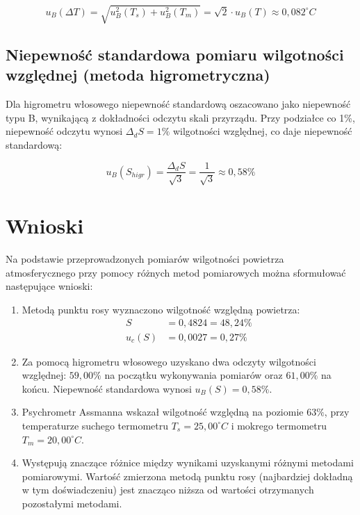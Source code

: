 \documentclass[a4paper,12pt]{article}
\begin{document}
\begin{equation}
    u_B(\Delta T) = \sqrt{u_B^2(T_s) + u_B^2(T_m)} = \sqrt{2} \cdot u_B(T) \approx 0{,}082^\circ C
\end{equation}


\subsection{Niepewność standardowa pomiaru wilgotności względnej (metoda higrometryczna)}

Dla higrometru włosowego niepewność standardową oszacowano jako niepewność typu B, wynikającą z dokładności odczytu skali przyrządu. Przy podziałce co 1\%, niepewność odczytu wynosi $\Delta_d S = 1\%$ wilgotności względnej, co daje niepewność standardową:

\begin{equation}
    u_B(S_{higr}) = \frac{\Delta_d S}{\sqrt{3}} = \frac{1}{\sqrt{3}} \approx 0{,}58\%
\end{equation}

\section{Wnioski}

Na podstawie przeprowadzonych pomiarów wilgotności powietrza atmosferycznego przy pomocy różnych metod pomiarowych można sformułować następujące wnioski:

\begin{enumerate}
    \item Metodą punktu rosy wyznaczono wilgotność względną powietrza:
          \begin{align*}
              S      & = 0{,}4824 = 48{,}24\% \\
              u_c(S) & = 0{,}0027 = 0{,}27\%
          \end{align*}

    \item Za pomocą higrometru włosowego uzyskano dwa odczyty wilgotności względnej: $59{,}00\%$ na początku wykonywania pomiarów oraz $61{,}00\%$ na końcu. Niepewność standardowa wynosi $u_B(S) = 0{,}58\%$.

    \item Psychrometr Assmanna wskazał wilgotność względną na poziomie $63\%$, przy temperaturze suchego termometru $T_s = 25{,}00^\circ C$ i mokrego termometru $T_m = 20{,}00^\circ C$.

    \item Występują znaczące różnice między wynikami uzyskanymi różnymi metodami pomiarowymi. Wartość zmierzona metodą punktu rosy (najbardziej dokładną w tym doświadczeniu) jest znacząco niższa od wartości otrzymanych pozostałymi metodami.

\end{enumerate}




\end{document}
